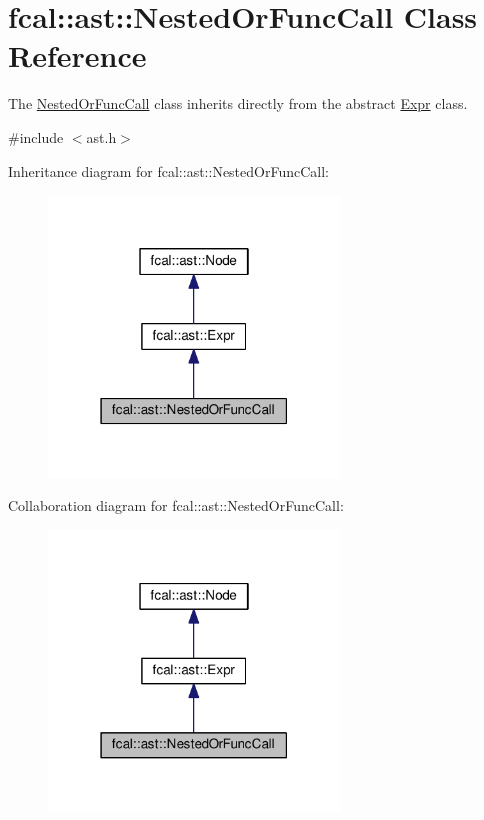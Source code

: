 \hypertarget{classfcal_1_1ast_1_1NestedOrFuncCall}{}\section{fcal\+:\+:ast\+:\+:Nested\+Or\+Func\+Call Class Reference}
\label{classfcal_1_1ast_1_1NestedOrFuncCall}


The \hyperlink{classfcal_1_1ast_1_1NestedOrFuncCall}{Nested\+Or\+Func\+Call} class inherits directly from the abstract \hyperlink{classfcal_1_1ast_1_1Expr}{Expr} class.  




{\ttfamily \#include $<$ast.\+h$>$}



Inheritance diagram for fcal\+:\+:ast\+:\+:Nested\+Or\+Func\+Call\+:
\nopagebreak
\begin{figure}[H]
\begin{center}
\leavevmode
\includegraphics[width=219pt]{classfcal_1_1ast_1_1NestedOrFuncCall__inherit__graph}
\end{center}
\end{figure}


Collaboration diagram for fcal\+:\+:ast\+:\+:Nested\+Or\+Func\+Call\+:
\nopagebreak
\begin{figure}[H]
\begin{center}
\leavevmode
\includegraphics[width=219pt]{classfcal_1_1ast_1_1NestedOrFuncCall__coll__graph}
\end{center}
\end{figure}
